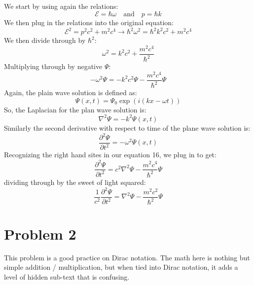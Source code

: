 \documentclass{article}
\begin{document}
\subsection{}
We start by using again the relations:
\begin{equation}
    \mathcal{E} = \hbar\omega \quad \text{and} \quad p = \hbar k
\end{equation}
We then plug in the relations into the original equation:
\begin{equation}
    \mathcal{E}^2 = p^2c^2 + m^2c^4 \rightarrow \hbar^2 \omega^2 = \hbar^2 k^2 c^2 + m^2c^4
\end{equation}
We then divide through by $\hbar^2$:
\begin{equation}
    \omega^2 = k^2 c^2 + \frac{m^2c^4}{\hbar^2}
\end{equation}
Multiplying through by negative $\Psi$:
\begin{equation}
    -\omega^2 \Psi = -k^2 c^2 \Psi - \frac{m^2c^4}{\hbar^2} \Psi
\end{equation}
Again, the plain wave solution is defined as:
\begin{equation}
    \Psi(x, t) = \Psi_0 \exp(i(kx - \omega t))
\end{equation}
So, the Laplacian for the plan wave solution is:
\begin{equation}
    \nabla^2 \Psi = -k^2 \Psi(x, t)
\end{equation}
Similarly the second derivative with respect to time of the plane wave solution is:
\begin{equation}
    \frac{\partial^2 \Psi}{\partial t^2} = -\omega^2 \Psi(x, t)
\end{equation}
Recognizing the right hand sites in our equation 16, we plug in to get:
\begin{equation}
    \frac{\partial^2 \Psi}{\partial t^2} = c^{2}\nabla^2 \Psi - \frac{m^2c^4}{\hbar^2} \Psi
\end{equation}
dividing through by the sweet of light squared:
\begin{equation}
    \boxed{\frac{1}{c^2} \frac{\partial^2 \Psi}{\partial t^2} = \nabla^2 \Psi - \frac{m^2c^2}{\hbar^2} \Psi}
\end{equation}
\section{Problem 2}

This problem is a good practice on Dirac notation. The math here is nothing but simple addition / multiplication, but when tied into Dirac notation, it adds a level of hidden sub-text that is confusing.
\end{document}
